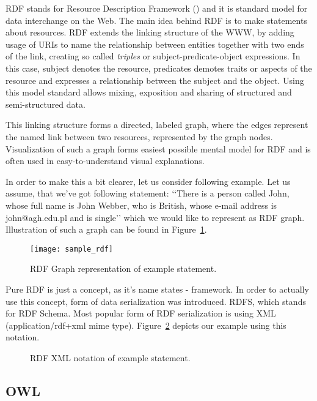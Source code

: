 RDF stands for Resource Description Framework (\cite{rdfPrimer:2004}) and it is standard
model for data interchange on the Web. The main idea behind RDF is to make statements about resources. RDF extends the linking structure of the WWW, by adding usage of URIs to name the relationship between entities together with two ends of the link, creating so called \emph{triples} or subject-predicate-object expressions. In this case, subject denotes the resource, predicates demotes traits or aspects of the resource and expresses a relationship between the subject and the object. Using this model standard allows mixing, exposition and sharing of structured and semi-structured data.

This linking structure forms a directed, labeled graph, where the edges represent the named link between
two resources, represented by the graph nodes. Visualization of such a graph forms easiest possible mental model for RDF and is often used in easy-to-understand visual explanations.

In order to make this a bit clearer, let us consider following example. Let us assume, that we\rq{}ve got following statement: \lq\lq{}There is a person called John, whose full name is John Webber, who is British, whose e-mail address is john@agh.edu.pl and is single\rq\rq{} which we would like to represent as RDF graph. Illustration of such a graph can be found in Figure~\ref{fig:sample_rdf}.

\begin{figure}[ht]
  \centering
  \texttt{[image: sample\_rdf]}
  \caption{RDF Graph representation of example statement.}
  \label{fig:sample_rdf}
\end{figure}

Pure RDF is just a concept, as it\rq{}s name states - framework. In order to actually use this concept, form of data serialization was introduced. RDFS, which stands for RDF Schema\cite{rdfRef:2004}. Most popular form of RDF serialization is using XML (application/rdf+xml mime type). Figure~\ref{fig:sample_rdf_xml} depicts our example using this notation.

\begin{figure}[ht]
  \centering
  
  \caption{RDF XML notation of example statement.}
  \label{fig:sample_rdf_xml}
\end{figure}


\subsection{OWL}

